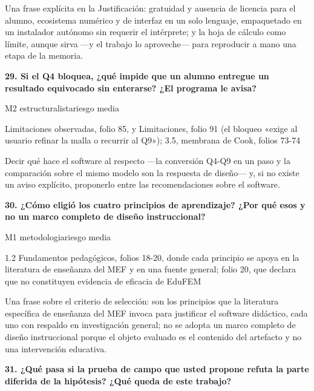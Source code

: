 {\small{}Una frase explícita en la Justificación: gratuidad y ausencia de licencia para el alumno, ecosistema numérico y de interfaz en un solo lenguaje, empaquetado en un instalador autónomo sin requerir el intérprete; y la hoja de cálculo como límite, aunque sirva —y el trabajo lo aproveche— para reproducir a mano una etapa de la memoria.\par}
\vspace{5pt}
\noindent\casilla\textbf{29. Si el Q4 bloquea, ¿qué impide que un alumno entregue un resultado equivocado sin enterarse? ¿El programa le avisa?}\par
{\small\color{gris}\sffamily M2 estructuralista\quad{}\quad riesgo media}\par
{\small{}Limitaciones observadas, folio 85, y Limitaciones, folio 91 (el bloqueo «exige al usuario refinar la malla o recurrir al Q9»); 3.5, membrana de Cook, folios 73-74\par}
{\small{}Decir qué hace el software al respecto —la conversión Q4-Q9 en un paso y la comparación sobre el mismo modelo son la respuesta de diseño— y, si no existe un aviso explícito, proponerlo entre las recomendaciones sobre el software.\par}
\vspace{5pt}
\noindent\casilla\textbf{30. ¿Cómo eligió los cuatro principios de aprendizaje? ¿Por qué esos y no un marco completo de diseño instruccional?}\par
{\small\color{gris}\sffamily M1 metodologia\quad{}\quad riesgo media}\par
{\small{}1.2 Fundamentos pedagógicos, folios 18-20, donde cada principio se apoya en la literatura de enseñanza del MEF y en una fuente general; folio 20, que declara que no constituyen evidencia de eficacia de EduFEM\par}
{\small{}Una frase sobre el criterio de selección: son los principios que la literatura específica de enseñanza del MEF invoca para justificar el software didáctico, cada uno con respaldo en investigación general; no se adopta un marco completo de diseño instruccional porque el objeto evaluado es el contenido del artefacto y no una intervención educativa.\par}
\vspace{5pt}
\noindent\casilla\textbf{31. ¿Qué pasa si la prueba de campo que usted propone refuta la parte diferida de la hipótesis? ¿Qué queda de este trabajo?}\par
